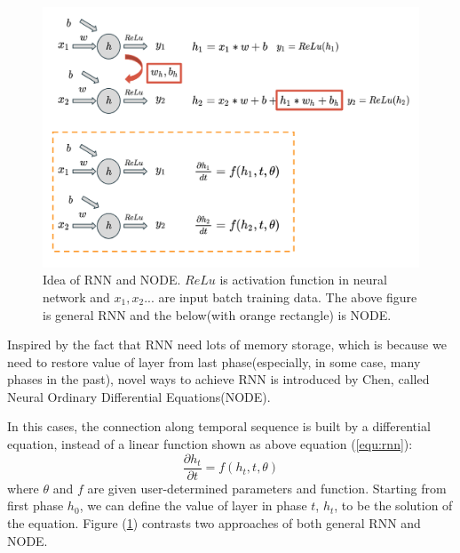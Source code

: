 \documentclass{article}
\begin{document}
\begin{figure}[ht]
\vskip 0.05in
\begin{center}
\centerline{\includegraphics[width=.5\textwidth]{intro.png}}
\caption{Idea of RNN and NODE. $ReLu$ is activation function in neural network and $x_1, x_2...$ are input batch training data. The above figure is general RNN and the below(with orange rectangle) is NODE.}
\label{fig:rnn}
\end{center}
\vskip -0.05in
\end{figure}

Inspired by the fact that RNN need lots of memory storage, which is because we need to restore value of layer from last phase(especially, in some case, many phases in the past), novel ways to achieve RNN is introduced by Chen, called Neural Ordinary Differential Equations(NODE)\cite{Chen2018NeuralEquations}.

In this cases, the connection along temporal sequence is built by a differential equation, instead of a linear function shown as above equation (\ref{equ:rnn}):
\begin{equation}
    \label{equ:node}
    \frac{\partial h_t}{\partial t} = f(h_t, t, \theta)
\end{equation}
where $\theta$ and $f$ are given user-determined parameters and function. Starting from first phase $h_0$, we can define the value of layer in phase $t$, $h_t$, to be the solution of the equation. Figure (\ref{fig:rnn}) contrasts two approaches of both general RNN and NODE.
\end{document}
